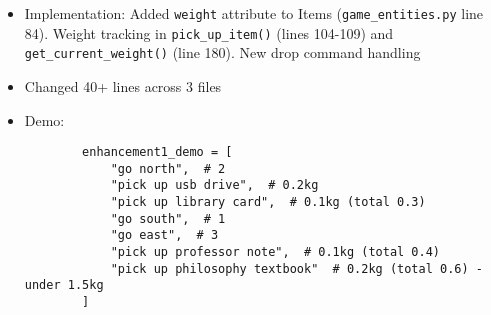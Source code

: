 \documentclass[11pt]{article}
\begin{document}
\begin{enumerate}
\begin{itemize}
        \item Implementation: Added \texttt{weight} attribute to Items (\texttt{game\_entities.py} line 84). Weight tracking in \texttt{pick\_up\_item()} (lines 104-109) and \texttt{get\_current\_weight()} (line 180). New drop command handling
        \item Changed 40+ lines across 3 files
        \item Demo:
        \begin{verbatim}
        enhancement1_demo = [
            "go north",  # 2
            "pick up usb drive",  # 0.2kg
            "pick up library card",  # 0.1kg (total 0.3)
            "go south",  # 1
            "go east",  # 3
            "pick up professor note",  # 0.1kg (total 0.4)
            "pick up philosophy textbook"  # 0.2kg (total 0.6) - under 1.5kg
        ]
        \end{verbatim}
    \end{itemize}
\end{enumerate}
\end{document}

